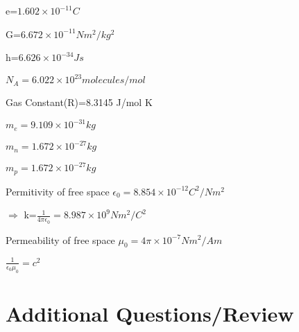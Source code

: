 \documentclass{article}
\begin{document}
e=$1.602\times10^{-11}C$

G=$6.672\times10^{-11}Nm^2/kg^2$

h=$6.626\times10^{-34}Js$

$N_A=6.022\times10^{23}molecules/mol$

Gas Constant(R)=8.3145 J/mol K

$m_e=9.109\times10^{-31}kg$

$m_n=1.672\times10^{-27}kg$

$m_p=1.672\times10^{-27}kg$

Permitivity of free space $\epsilon_0=8.854\times10^{-12}C^2/N m^2$

$\Rightarrow$ k=$\frac{1}{4\pi \epsilon_0}=8.987\times10^{9} Nm^2/C^2$

Permeability of free space $\mu_0=4\pi \times10^{-7}Nm^2/A m$

$\frac{1}{\epsilon_0 \mu_0} = c^2$









\section{Additional Questions/Review}
\end{document}
